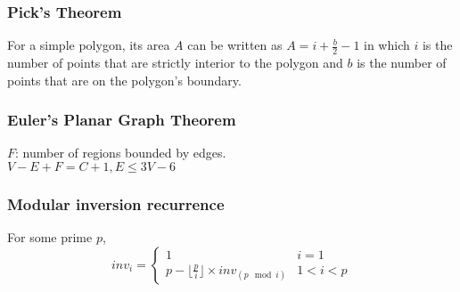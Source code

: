 \subsubsection{Pick's Theorem}
For a simple polygon, its area $A$ can be written as $A = i + \frac b2 - 1$ in which $i$ is the number of points that are strictly interior to the polygon and $b$ is the number of points that are on the polygon's boundary.
\subsubsection{Euler's Planar Graph Theorem}
\(F\): number of regions bounded by edges. \\
\(V - E + F = C + 1, E \le 3V - 6\)
\subsubsection{Modular inversion recurrence}
For some prime \(p\),
\[
inv_i = \begin{cases}
    1 & i = 1 \\
    p - \lfloor \frac{p}{i} \rfloor \times inv_{(p \mod i)} & 1 < i < p
\end{cases}
\]
